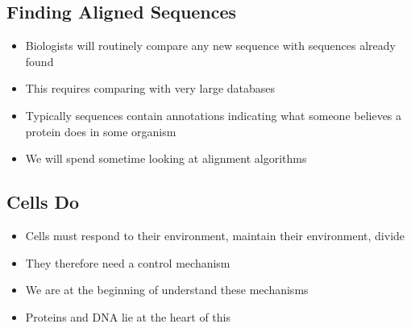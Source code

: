 
\begin{slide}
\section{Finding Aligned Sequences}

\begin{PauseHighLight}
  \begin{itemize}
  \item Biologists will routinely compare any new sequence with
    sequences already found\pause
  \item This requires comparing with very large databases\pause
  \item Typically sequences contain annotations indicating what someone
    believes a protein does in some organism\pause
  \item We will spend sometime looking at alignment algorithms\pause
  \end{itemize}
\end{PauseHighLight}

\end{slide}





\Outline %

\begin{slide}
\section{Cells Do}

\begin{PauseHighLight}
  \begin{itemize}
  \item Cells must respond to their environment, maintain their
    environment, divide\pause
  \item They therefore need a control mechanism\pause
  \item We are at the beginning of understand these mechanisms\pause
  \item Proteins and DNA lie at the heart of this\pause
  \end{itemize}
\end{PauseHighLight}

\end{slide}

